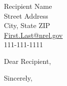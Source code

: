 \documentclass[12pt,letterpaper]{NRELletter}
\begin{document}

\begin{letter}{
Recipient Name\\
Street Address\\
City, State ZIP\\
\href{mailto:First.Last@nrel.gov}{First.Last@nrel.gov}\\ %
111-111-1111
}

\opening{Dear Recipient,}

\lipsum[1-5]

\closing{Sincerely,}



\end{letter}
\end{document}
